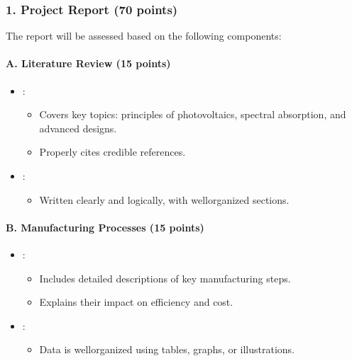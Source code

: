 \documentclass[letterpaper,10pt,english]{jupyterBook}
\begin{document}
\subsubsection{1. Project Report (70 points)}
\label{\detokenize{ProjectInstructions:project-report-70-points}}
\sphinxAtStartPar
The report will be assessed based on the following components:


\paragraph{A. Literature Review (15 points)}
\label{\detokenize{ProjectInstructions:a-literature-review-15-points}}\begin{itemize}
\item {} 
\sphinxAtStartPar
{}:
\begin{itemize}
\item {} 
\sphinxAtStartPar
Covers key topics: principles of photovoltaics, spectral
absorption, and advanced designs.

\item {} 
\sphinxAtStartPar
Properly cites credible references.

\end{itemize}

\item {} 
\sphinxAtStartPar
{}:
\begin{itemize}
\item {} 
\sphinxAtStartPar
Written clearly and logically, with well\sphinxhyphen{}organized sections.

\end{itemize}

\end{itemize}


\paragraph{B. Manufacturing Processes (15 points)}
\label{\detokenize{ProjectInstructions:b-manufacturing-processes-15-points}}\begin{itemize}
\item {} 
\sphinxAtStartPar
{}:
\begin{itemize}
\item {} 
\sphinxAtStartPar
Includes detailed descriptions of key manufacturing steps.

\item {} 
\sphinxAtStartPar
Explains their impact on efficiency and cost.

\end{itemize}

\item {} 
\sphinxAtStartPar
{}:
\begin{itemize}
\item {} 
\sphinxAtStartPar
Data is well\sphinxhyphen{}organized using tables, graphs, or illustrations.

\end{itemize}

\end{itemize}
\end{document}
